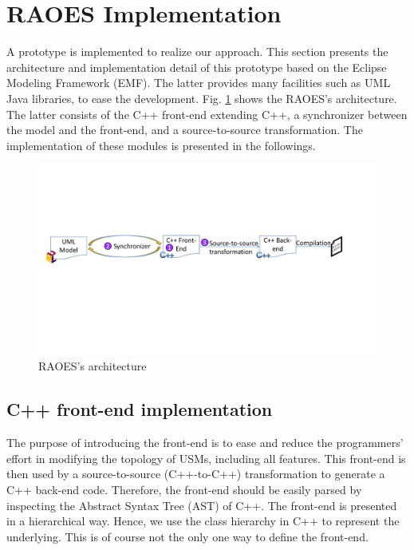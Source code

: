 \section{RAOES Implementation}
\label{sec:implementation}
A prototype is implemented to realize our approach. 
This section presents the architecture and implementation detail of this prototype based on the Eclipse Modeling Framework (EMF).
The latter provides many facilities such as UML Java libraries, to ease the development.
Fig. \ref{fig:architecture} shows the RAOES's architecture.
The latter consists of the C++ front-end extending C++, a synchronizer between the model and the front-end, and a source-to-source transformation.
The implementation of these modules is presented in the followings. 

\begin{figure}
	\centering
	\includegraphics[clip, trim=0.8cm 9.5cm 3.2cm 6.8cm, width=1.0\columnwidth]{figures/architecture.pdf}
	\caption{RAOES's architecture} 
	\label{fig:architecture}
\end{figure}

\subsection{C++ front-end implementation}
The purpose of introducing the front-end is to ease and reduce the programmers' effort in modifying the topology of USMs, including all features.
This front-end is then used by a source-to-source (C++-to-C++) transformation to generate a C++ back-end code.
Therefore, the front-end should be easily parsed by inspecting the Abstract Syntax Tree (AST) of C++.
The front-end is presented in a hierarchical way.
Hence, we use the class hierarchy in C++ to represent the underlying.
This is of course not the only one way to define the front-end.

